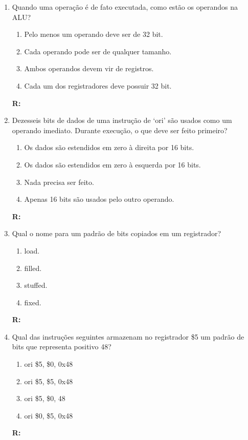\documentclass[a4paper,11pt]{article}
\begin{document}
\begin{enumerate}
    \item{Quando uma operação é de fato executada, como estão os operandos na ALU?}
        \begin{enumerate}
            \item{Pelo menos um operando deve ser de 32 bit.}
            \item{Cada operando pode ser de qualquer tamanho.}
            \item{Ambos operandos devem vir de registros.}
            \item{Cada um dos registradores deve possuir 32 bit.}
        \end{enumerate}
        \textbf{R:}

    \item{Dezesseis bits de dados de uma instrução de `ori' são usados como um operando imediato. Durante
            execução, o que deve ser feito primeiro?}
        \begin{enumerate}
            \item{Os dados são estendidos em zero à direita por 16 bits.}
            \item{Os dados são estendidos em zero à esquerda por 16 bits.}
            \item{Nada precisa ser feito.}
            \item{Apenas 16 bits são usados pelo outro operando.}
        \end{enumerate}
        \textbf{R: }

    \item{Qual o nome para um padrão de bits copiados em um registrador?}
        \begin{enumerate}
            \item{load.}
            \item{filled.}
            \item{stuffed.}
            \item{fixed.}
        \end{enumerate}
        \textbf{R: }

    \item{Qual das instruções seguintes armazenam no registrador \$5 um padrão de bits que
            representa positivo 48?}
        \begin{enumerate}
            \item{ori \$5, \$0, 0x48}
            \item{ori \$5, \$5, 0x48}
            \item{ori \$5, \$0, 48}
            \item{ori \$0, \$5, 0x48}
        \end{enumerate}
        \textbf{R: }


\end{enumerate}
\end{document}
